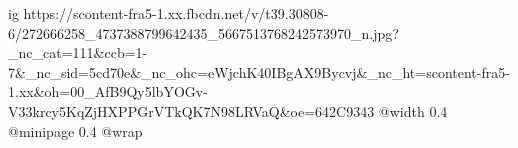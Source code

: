  
 
 
 
 

\ifcmt
  ig https://scontent-fra5-1.xx.fbcdn.net/v/t39.30808-6/272666258_4737388799642435_5667513768242573970_n.jpg?_nc_cat=111&ccb=1-7&_nc_sid=5cd70e&_nc_ohc=eWjchK40IBgAX9Bycvj&_nc_ht=scontent-fra5-1.xx&oh=00_AfB9Qy5lbYOGv-V33krcy5KqZjHXPPGrVTkQK7N98LRVaQ&oe=642C9343
  @width 0.4
  @minipage 0.4
  @wrap \parpic[r]
\fi
